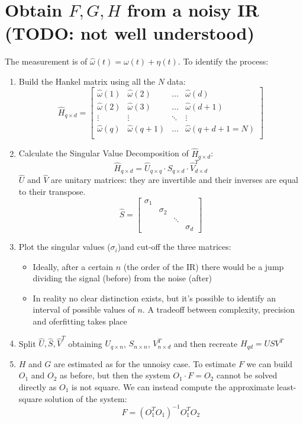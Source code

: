 \documentclass{report}
\begin{document}
\section{Obtain $F,G,H$ from a noisy IR (TODO: not well understood)}
The measurement is of $\hat{\omega}(t)=\omega(t)+\eta(t)$. To identify the process:
\begin{enumerate}
\item Build the Hankel matrix using all the $N$ data:
\[
\hat{H}_{q \times d}=
\begin{bmatrix}
\hat{\omega}(1)&\hat{\omega}(2)&\dots&\hat{\omega}(d)\\
\hat{\omega}(2)&\hat{\omega}(3)&\dots&\hat{\omega}(d+1)\\
\vdots&\vdots&\ddots&\vdots\\
\hat{\omega}(q)&\hat{\omega}(q+1)&\dots&\hat{\omega}(q+d+1=N)\\
\end{bmatrix}
\]
\item Calculate the Singular Value Decomposition of $\hat{H}_{q \times d}$:
\[
\hat{H}_{q \times d}=\hat{U}_{q \times q} \cdot \hat{S}_{q \times d} \cdot \hat{V}^T_{d \times d}
\]
$\hat{U}$ and $\hat{V}$ are unitary matrices: they are invertible and their inverses are equal to their transpose.
\[
\hat{S}=\begin{bmatrix}
\sigma_1\\
&\sigma_2\\
&&\ddots\\
&&&\sigma_d
\end{bmatrix}
\]
\item Plot the singular values ($\sigma_i$)and cut-off the three matrices:
	\begin{itemize}
	\item Ideally, after a certain $n$ (the order of the IR) there would be a jump dividing the signal (before) from the noise (after)
	\item In reality no clear distinction exists, but it's possible to identify an interval of possible values of $n$. A tradeoff between complexity, precision and oferfitting takes place
	\end{itemize}
\item Split $\hat{U},\hat{S},\hat{V}^T$ obtaining $U_{q \times n}$, $S_{n \times n}$, $V^T_{n \times d}$ and then recreate $H_{qd}=USV^T$
\item $H$ and $G$ are estimated as for the unnoisy case. To estimate $F$ we can build $O_1$ and $O_2$ as before, but then the system $O_1 \cdot F = O_2$ cannot be solved directly as $O_1$ is not square. We can instead compute the approximate least-square solution of the system:
\[
F=(O_1^TO_1)^{-1}O_1^TO_2
\]
\end{enumerate}
\end{document}
